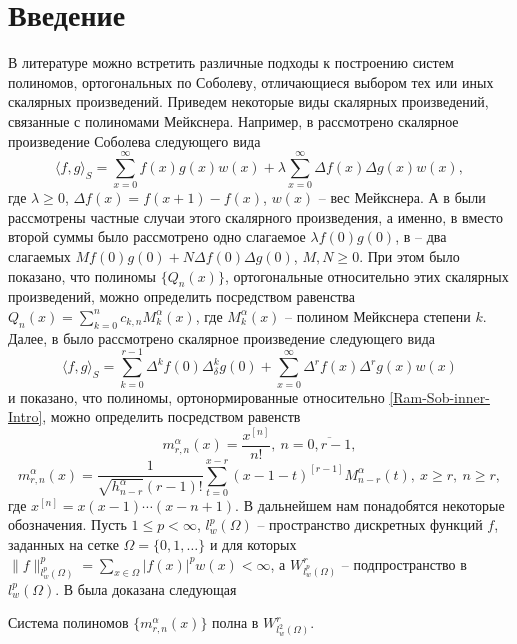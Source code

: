 \section{Введение}
В литературе можно встретить различные подходы к построению систем полиномов, ортогональных по Соболеву, отличающиеся выбором тех или иных скалярных произведений.
Приведем некоторые виды скалярных произведений, связанные с полиномами Мейкснера.
Например, в \cite{Ram-Ar-Go-Mar, Ram-Kh-Old} рассмотрено скалярное произведение Соболева следующего вида
$$
\langle f,g\rangle_S=\sum_{x=0}^{\infty}f(x)g(x)w(x)+\lambda\sum_{x=0}^{\infty}\Delta f(x)\Delta g(x)w(x),
$$
где $\lambda\ge 0$, $\Delta f(x)=f(x+1)-f(x)$, $w(x)$ -- вес Мейкснера. А в \cite{Ram-Bav1, Ram-Bav2} были рассмотрены частные случаи этого скалярного произведения, а именно, в \cite{Ram-Bav1} вместо второй суммы было рассмотрено одно слагаемое $\lambda f(0)g(0)$, в \cite{Ram-Bav2} -- два слагаемых $Mf(0)g(0)+N\Delta f(0)\Delta g(0)$, $M,N\ge 0$. При этом было показано, что полиномы $\{Q_n(x)\}$, ортогональные относительно этих скалярных произведений, можно определить посредством равенства $Q_n(x)=\sum_{k=0}^{n}c_{k,n}M_k^\alpha(x)$, где $M_k^\alpha(x)$ -- полином Мейкснера степени $k$. Далее, в \cite{Ram-Shar-VMJ, Ram-Shar-Sar} было рассмотрено скалярное произведение следующего вида
\begin{equation}\label{Ram-Sob-inner-Intro}
\langle f,g\rangle_S=\sum_{k=0}^{r-1}\Delta^kf(0)\Delta_\delta^kg(0)+\sum_{x=0}^\infty\Delta^rf(x)\Delta^rg(x)w(x)
\end{equation}
и показано, что полиномы, ортонормированные относительно \eqref{Ram-Sob-inner-Intro}, можно определить посредством равенств
$$
m_{r,n}^{\alpha}(x)=\frac{x^{[n]}}{n!},\ n=\overline{0,r-1},
$$
$$
m_{r,n}^{\alpha}(x)=
\frac{1}{\sqrt{h_{n-r}^\alpha}(r-1)!}\sum_{t=0}^{x-r}(x-1-t)^{[r-1]}M_{n-r}^\alpha(t),\ x\ge r,\ n\ge r,
$$
где $x^{[n]}=x(x-1)\cdots(x-n+1)$.
В дальнейшем нам понадобятся некоторые обозначения. Пусть $1\le p<\infty$, $l_w^p(\Omega)$ -- пространство дискретных функций $f$, заданных на сетке $\Omega=\{0, 1, \ldots\}$ и для которых $\|f\|_{l_{w}^p(\Omega)}^p=\sum_{x\in\Omega}|f(x)|^pw(x)<\infty$, а $W^r_{l_{w}^p(\Omega)}$ -- подпространство в $l_{w}^p(\Omega)$.
В \cite{Ram-Shar-Sar} была доказана следующая

\begin{theoremA}\label{GRM-th-B}
Система полиномов $\{m_{r,n}^\alpha(x)\}$ полна в $W^r_{l_w^2(\Omega)}$.
\end{theoremA}

